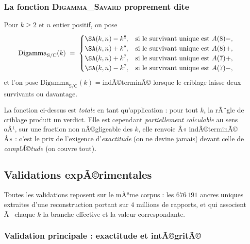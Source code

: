 \subsubsection{La fonction \textsc{Digamma\_Savard} proprement dite}

\begin{boiteformule}
Pour $k \ge 2$ et $n$ entier positif, on pose
\[
  \mathrm{Digamma}_{\mathrm{S/C}}(k) \;=\;
  \begin{cases}
    \SA(k,n) - k^{8}, & \text{si le survivant unique est } A(8)-,\\
    \SA(k,n) + k^{8}, & \text{si le survivant unique est } A(8)+,\\
    \SA(k,n) + k^{7}, & \text{si le survivant unique est } A(7)+,\\
    \SA(k,n) - k^{7}, & \text{si le survivant unique est } A(7)-,
  \end{cases}
\]
et l'on pose $\mathrm{Digamma}_{\mathrm{S/C}}(k) = \text{indÃ©terminÃ©}$
lorsque le criblage laisse deux survivants ou davantage.
\end{boiteformule}

\begin{boitenote}
La fonction ci-dessus est \emph{totale} en tant qu'application : pour
tout $k$, la rÃ¨gle de criblage produit un verdict. Elle est cependant
\emph{partiellement calculable} au sens oÃ¹, sur une fraction non
nÃ©gligeable des $k$, elle renvoie Â« indÃ©terminÃ© Â» : c'est le prix de
l'exigence d'\emph{exactitude} (on ne devine jamais) devant celle de
\emph{complÃ©tude} (on couvre tout).
\end{boitenote}
\subsection{Validations expÃ©rimentales}

Toutes les validations reposent sur le mÃªme corpus : les
$676\,191$ ancres uniques extraites d'une reconstruction portant sur
$4$ millions de rapports, et qui associent Ã  chaque $k$ la branche
effective et la valeur correspondante.

\subsubsection{Validation principale : exactitude et intÃ©gritÃ©}


